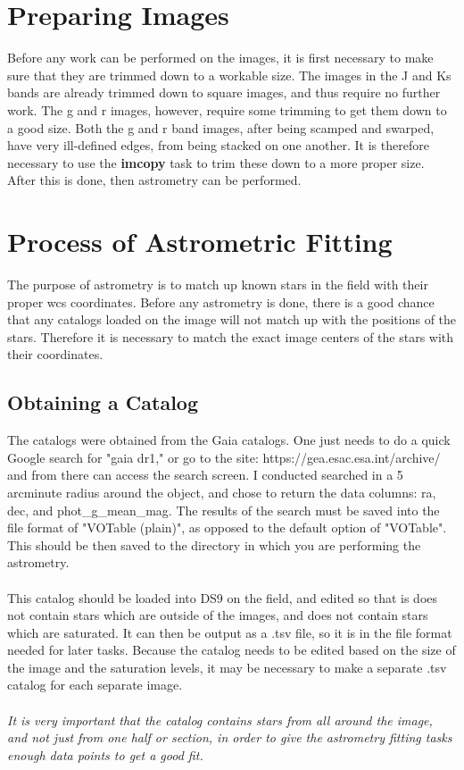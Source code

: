 \documentclass[a4paper]{article}
\begin{document}
\section{Preparing Images}
Before any work can be performed on the images, it is first necessary to make sure that they are trimmed down to a workable size.  The images in the J and Ks bands are already trimmed down to square images, and thus require no further work.  The g and r images, however, require some trimming to get them down to a good size.  Both the g and r band images, after being scamped and swarped, have very ill-defined edges, from being stacked on one another.  It is therefore necessary to use the \textbf{imcopy} task to trim these down to a more proper size.  After this is done, then astrometry can be performed.

\section{Process of Astrometric Fitting}
The purpose of astrometry is to match up known stars in the field with their proper wcs coordinates.  Before any astrometry is done, there is a good chance that any catalogs loaded on the image will not match up with the positions of the stars.  Therefore it is necessary to match the exact image centers of the stars with their coordinates.

\subsection{Obtaining a Catalog}
The catalogs were obtained from the Gaia catalogs.  One just needs to do a quick Google search for "gaia dr1," or go to the site: https://gea.esac.esa.int/archive/ and from there can access the search screen.  I conducted searched in a 5 arcminute radius around the object, and chose to return the data columns: ra, dec, and  phot\_g\_mean\_mag.  The results of the search must be saved into the file format of "VOTable (plain)", as opposed to the default option of "VOTable".  This should be then saved to the directory in which you are performing the astrometry. \\ \\
This catalog should be loaded into DS9 on the field, and edited so that is does not contain stars which are outside of the images, and does not contain stars which are saturated.  It can then be output as a .tsv file, so it is in the file format needed for later tasks.  Because the catalog needs to be edited based on the size of the image and the saturation levels, it may be necessary to make a separate .tsv catalog for each separate image. \\ \\
\textit{It is very important that the catalog contains stars from all around the image, and not just from one half or section, in order to give the astrometry fitting tasks enough data points to get a good fit.}
\end{document}
